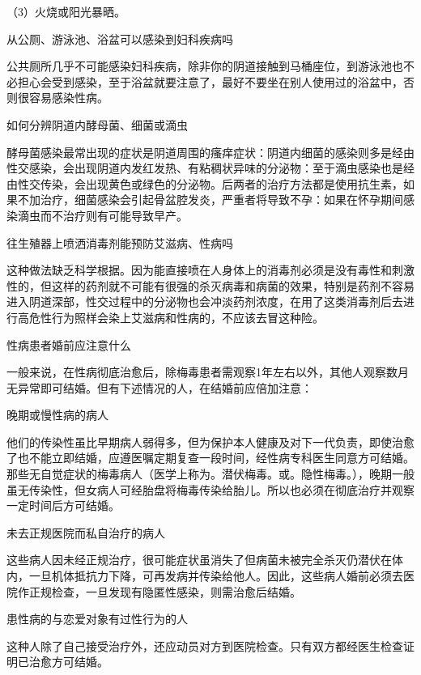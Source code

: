 \documentclass[12pt,UTF8]{ctexbook}
\begin{document}
（3）火烧或阳光暴晒。





从公厕、游泳池、浴盆可以感染到妇科疾病吗


公共厕所几乎不可能感染妇科疾病，除非你的阴道接触到马桶座位，到游泳池也不必担心会受到感染，至于浴盆就要注意了，最好不要坐在别人使用过的浴盆中，否则很容易感染性病。





如何分辨阴道内酵母菌、细菌或滴虫


酵母菌感染最常出现的症状是阴道周围的瘙痒症状：阴道内细菌的感染则多是经由性交感染，会出现阴道内发红发热、有粘稠状异味的分泌物：至于滴虫感染也是经由性交传染，会出现黄色或绿色的分泌物。后两者的治疗方法都是使用抗生素，如果不加治疗，细菌感染会引起骨盆腔发炎，严重者将导致不孕：如果在怀孕期间感染滴虫而不治疗则有可能导致早产。





往生殖器上喷洒消毒剂能预防艾滋病、性病吗


这种做法缺乏科学根据。因为能直接喷在人身体上的消毒剂必须是没有毒性和刺激性的，但这样的药剂就不可能有很强的杀灭病毒和病菌的效果，特别是药剂不容易进入阴道深部，性交过程中的分泌物也会冲淡药剂浓度，在用了这类消毒剂后去进行高危性行为照样会染上艾滋病和性病的，不应该去冒这种险。





性病患者婚前应注意什么


一般来说，在性病彻底治愈后，除梅毒患者需观察1年左右以外，其他人观察数月无异常即可结婚。但有下述情况的人，在结婚前应倍加注意：

晚期或慢性病的病人

他们的传染性虽比早期病人弱得多，但为保护本人健康及对下一代负责，即使治愈了也不能立即结婚，应遵医嘱定期复查一段时间，经性病专科医生同意方可结婚。那些无自觉症状的梅毒病人（医学上称为。潜伏梅毒。或。隐性梅毒。），晚期一般虽无传染性，但女病人可经胎盘将梅毒传染给胎儿。所以也必须在彻底治疗并观察一定时间后方可结婚。

未去正规医院而私自治疗的病人

这些病人因未经正规治疗，很可能症状虽消失了但病菌未被完全杀灭仍潜伏在体内，一旦机体抵抗力下降，可再发病并传染给他人。因此，这些病人婚前必须去医院作正规检查，一旦发现有隐匿性感染，则需治愈后结婚。

患性病的与恋爱对象有过性行为的人

这种人除了自己接受治疗外，还应动员对方到医院检查。只有双方都经医生检查证明已治愈方可结婚。
\end{document}
